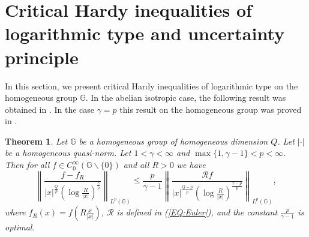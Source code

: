 \documentclass[a4paper,12pt,reqno]{amsart}
\renewcommand\eqref[1]{(\ref{#1})} %
\numberwithin{equation}{section}
\theoremstyle{plain}
\newtheorem{thm}{Theorem}[section]
\theoremstyle{definition}
\begin{document}
\section{Critical Hardy inequalities of logarithmic type and uncertainty principle}
\label{SEC:critHardy}
In this section, we present critical Hardy inequalities of logarithmic type on the homogeneous group
$\mathbb{G}$. In the abelian isotropic case, the following result was obtained in \cite{MOW15}. In the case $\gamma=p$ this result on the homogeneous group was proved in \cite{Ruzhansky-Suragan:critical}.
\begin{thm}\label{ScalHardy} Let $\mathbb{G}$ be a homogeneous group
of homogeneous dimension $Q$. Let $|\cdot|$ be a homogeneous quasi-norm. Let $1<\gamma<\infty$ and $\max\{1,\gamma-1\}<p<\infty$.
Then for all $f\in C_{0}^{\infty}(\mathbb{G}\backslash\{0\})$ and all $R>0$ we have
\begin{equation}\label{ScalHardy1}\left\|\frac{f-f_{R}}{|x|^{\frac{Q}{p}}
\left(\log\frac{R}{|x|}\right)^{\frac{\gamma}{p}}}\right\|_{L^{p}(\mathbb{G})}
\leq\frac{p}{\gamma-1}\left\|
\frac{\mathcal{R}f}{|x|^{\frac{Q-p}{p}}\left(\log\frac{R}{|x|}\right)^{\frac{\gamma-p}{p}}} \right\|_{L^{p}(\mathbb{G})},
\end{equation}
where $f_{R}(x)=f\left(R\frac{x}{|x|}\right)$, $\mathcal{R}$ is defined in \eqref{EQ:Euler}, and the constant $\frac{p}{\gamma-1}$ is optimal.
\end{thm}
\end{document}
